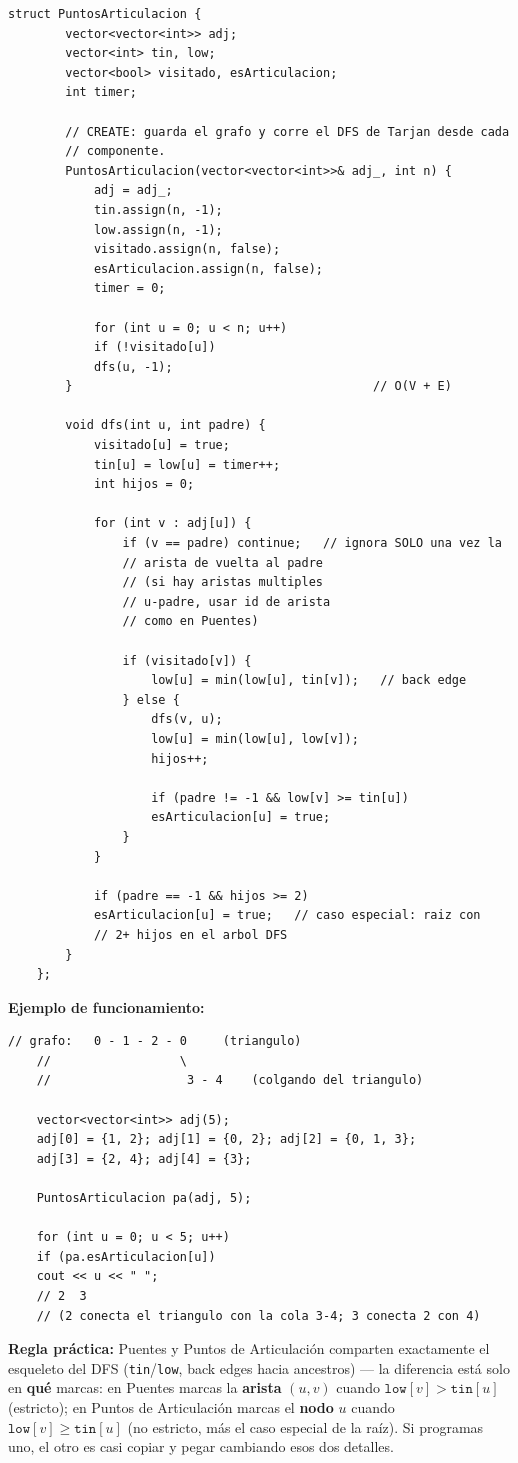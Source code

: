 \documentclass[10pt,a4paper,twocolumn]{article}
\begin{document}
\begin{lstlisting}[style=cpp]
	struct PuntosArticulacion {
		vector<vector<int>> adj;
		vector<int> tin, low;
		vector<bool> visitado, esArticulacion;
		int timer;
		
		// CREATE: guarda el grafo y corre el DFS de Tarjan desde cada
		// componente.
		PuntosArticulacion(vector<vector<int>>& adj_, int n) {
			adj = adj_;
			tin.assign(n, -1);
			low.assign(n, -1);
			visitado.assign(n, false);
			esArticulacion.assign(n, false);
			timer = 0;
			
			for (int u = 0; u < n; u++)
			if (!visitado[u])
			dfs(u, -1);
		}                                          // O(V + E)
		
		void dfs(int u, int padre) {
			visitado[u] = true;
			tin[u] = low[u] = timer++;
			int hijos = 0;
			
			for (int v : adj[u]) {
				if (v == padre) continue;   // ignora SOLO una vez la
				// arista de vuelta al padre
				// (si hay aristas multiples
				// u-padre, usar id de arista
				// como en Puentes)
				
				if (visitado[v]) {
					low[u] = min(low[u], tin[v]);   // back edge
				} else {
					dfs(v, u);
					low[u] = min(low[u], low[v]);
					hijos++;
					
					if (padre != -1 && low[v] >= tin[u])
					esArticulacion[u] = true;
				}
			}
			
			if (padre == -1 && hijos >= 2)
			esArticulacion[u] = true;   // caso especial: raiz con
			// 2+ hijos en el arbol DFS
		}
	};
\end{lstlisting}

\textbf{Ejemplo de funcionamiento:}

\begin{lstlisting}[style=cpp]
	// grafo:   0 - 1 - 2 - 0     (triangulo)
	//                  \
	//                   3 - 4    (colgando del triangulo)
	
	vector<vector<int>> adj(5);
	adj[0] = {1, 2}; adj[1] = {0, 2}; adj[2] = {0, 1, 3};
	adj[3] = {2, 4}; adj[4] = {3};
	
	PuntosArticulacion pa(adj, 5);
	
	for (int u = 0; u < 5; u++)
	if (pa.esArticulacion[u])
	cout << u << " ";
	// 2  3
	// (2 conecta el triangulo con la cola 3-4; 3 conecta 2 con 4)
\end{lstlisting}

\textbf{Regla práctica:} Puentes y Puntos de Articulación comparten
exactamente el esqueleto del DFS (\texttt{tin}/\texttt{low}, back
edges hacia ancestros) — la diferencia está solo en \textbf{qué}
marcas: en Puentes marcas la \textbf{arista} $(u,v)$ cuando
$\texttt{low}[v] > \texttt{tin}[u]$ (estricto); en Puntos de
Articulación marcas el \textbf{nodo} $u$ cuando
$\texttt{low}[v] \ge \texttt{tin}[u]$ (no estricto, más el caso
especial de la raíz). Si programas uno, el otro es casi copiar y
pegar cambiando esos dos detalles.
\end{document}

